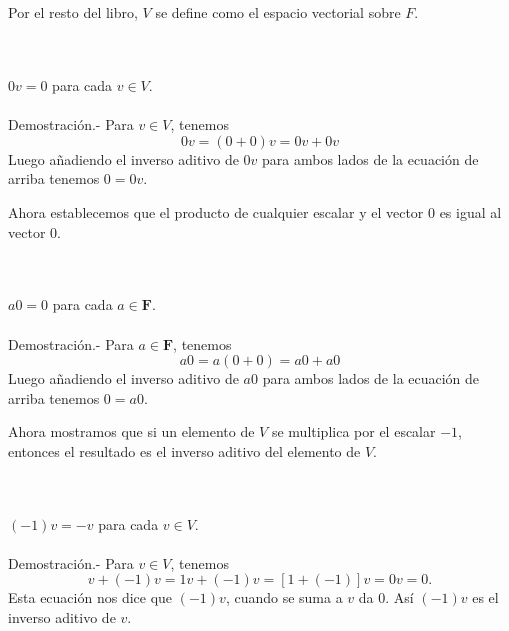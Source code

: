     \begin{mynot}[$\textbf{V}$]\;\\\\
	Por el resto del libro, $V$ se define como el espacio vectorial sobre $F$.
    \end{mynot}

\begin{myteo}\;\\\\
    $0v=0$ para cada $v\in V$.\\\\
	Demostración.-\; Para $v\in V$, tenemos
	$$0v=(0+0)v=0v+0v$$
	Luego añadiendo el inverso aditivo de $0v$ para ambos lados de la ecuación de arriba tenemos $0=0v$. 
\end{myteo}
\vspace{0.3cm}

Ahora  establecemos que el producto de cualquier escalar y el vector $0$ es igual al vector $0$.\\

\begin{myteo}\;\\\\
    $a0=0$ para cada $a\in \textbf{F}$.\\\\
	Demostración.-\; Para $a\in \textbf{F}$, tenemos 
	$$a0=a(0+0)=a0+a0$$
	Luego añadiendo el inverso aditivo de $a0$ para ambos lados de la ecuación de arriba tenemos $0=a0$. 
\end{myteo}
\vspace{0.3cm}

Ahora mostramos que si un elemento de $V$ se multiplica por el escalar $-1$, entonces el resultado es el inverso aditivo del elemento de $V$.\\

\begin{myteo}\;\\\\
    $(-1)v=-v$ para cada $v\in V$.\\\\
    	Demostración.-\; Para $v\in V$, tenemos
	$$v+(-1)v=1v+(-1)v=[1+(-1)]v=0v=0.$$
	Esta ecuación nos dice que $(-1)v$, cuando se suma a $v$ da $0$. Así $(-1)v$ es el inverso aditivo de $v$. 
\end{myteo}
\vspace{0.5cm}

